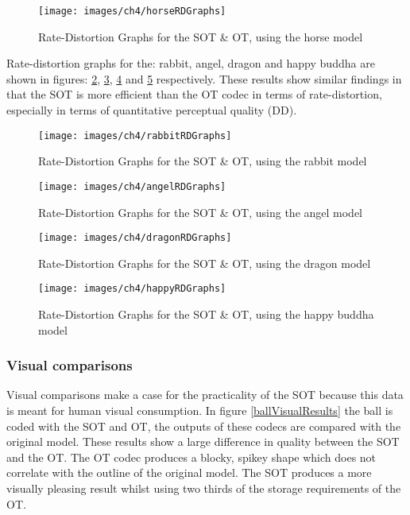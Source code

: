 \begin{figure}[!h]
\centering
\texttt{[image: images/ch4/horseRDGraphs]}
\caption{Rate-Distortion Graphs for the SOT \& OT, using the horse model}
\label{horseRDGraphs}
\end{figure}

Rate-distortion graphs for the: rabbit, angel, dragon and happy buddha are shown in figures: \ref{rabbitRDGraphs}, \ref{angelRDGraphs}, \ref{dragonRDGraphs} and \ref{happyRDGraphs} respectively. These results show similar findings in that the SOT is more efficient than the OT codec in terms of rate-distortion, especially in terms of quantitative perceptual quality (DD).

\begin{figure}[!h]
\centering
\texttt{[image: images/ch4/rabbitRDGraphs]}
\caption{Rate-Distortion Graphs for the SOT \& OT, using the rabbit model}
\label{rabbitRDGraphs}
\end{figure}

\begin{figure}[!h]
\centering
\texttt{[image: images/ch4/angelRDGraphs]}
\caption{Rate-Distortion Graphs for the SOT \& OT, using the angel model}
\label{angelRDGraphs}
\end{figure}

\begin{figure}[!h]
\centering
\texttt{[image: images/ch4/dragonRDGraphs]}
\caption{Rate-Distortion Graphs for the SOT \& OT, using the dragon model}
\label{dragonRDGraphs}
\end{figure}

\begin{figure}[!h]
\centering
\texttt{[image: images/ch4/happyRDGraphs]}
\caption{Rate-Distortion Graphs for the SOT \& OT, using the happy buddha model}
\label{happyRDGraphs}
\end{figure}
\clearpage
\subsubsection{Visual comparisons}

Visual comparisons make a case for the practicality of the SOT because this data is meant for human visual consumption. In figure \ref{ballVisualResults} the ball is coded with the SOT and OT, the outputs of these codecs are compared with the original model. These results show a large difference in quality between the SOT and the OT. The OT codec produces a blocky, spikey shape which does not correlate with the outline of the original model. The SOT produces a more visually pleasing result whilst using two thirds of the storage requirements of the OT. 

